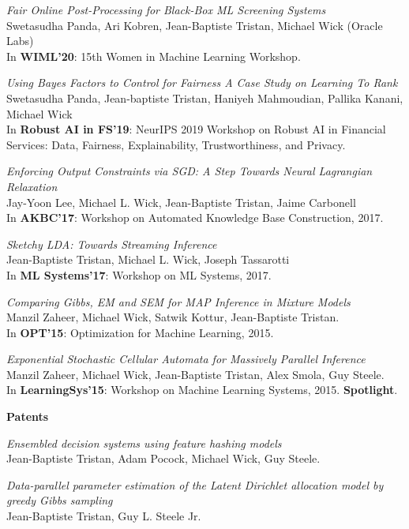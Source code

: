 \documentclass[margin,line]{res}
\begin{document}
\begin{resume}
\emph{Fair Online Post-Processing for Black-Box ML Screening Systems}\\
Swetasudha Panda, Ari Kobren, Jean-Baptiste Tristan, Michael Wick (Oracle Labs)\\
In {\bf WIML'20}: 15th Women in Machine Learning Workshop.

\emph{Using Bayes Factors to Control for Fairness A Case Study on Learning To Rank}\\
Swetasudha Panda, Jean-baptiste Tristan, Haniyeh Mahmoudian, Pallika Kanani, Michael Wick\\
In {\bf Robust AI in FS'19}: NeurIPS 2019 Workshop on Robust AI in Financial Services: Data, Fairness, Explainability, Trustworthiness, and Privacy.

\emph{Enforcing Output Constraints via SGD: A Step Towards Neural Lagrangian Relaxation}\\
Jay-Yoon Lee, Michael L. Wick, Jean-Baptiste Tristan, Jaime Carbonell\\
In {\bf AKBC'17}: Workshop on Automated Knowledge Base Construction, 2017.

\emph{Sketchy LDA: Towards Streaming Inference}\\
Jean-Baptiste Tristan, Michael L. Wick, Joseph Tassarotti\\
In {\bf ML Systems'17}: Workshop on ML Systems, 2017.


\emph{Comparing Gibbs, EM and SEM for MAP Inference in Mixture Models}\\
Manzil Zaheer, Michael Wick, Satwik Kottur, Jean-Baptiste Tristan.\\
In {\bf OPT'15}: Optimization for Machine Learning, 2015. 

\emph{Exponential Stochastic Cellular Automata for Massively Parallel Inference}\\
Manzil Zaheer, Michael Wick, Jean-Baptiste Tristan, Alex Smola, Guy Steele.\\
In {\bf LearningSys'15}: Workshop on Machine Learning Systems, 2015. {\bf Spotlight}. 

\newpage
  {\bf {\Large Patents}}

\emph{Ensembled decision systems using feature hashing models}\\
Jean-Baptiste Tristan, Adam Pocock, Michael Wick, Guy Steele.

\emph{Data-parallel parameter estimation of the Latent Dirichlet allocation model by greedy Gibbs sampling}\\
Jean-Baptiste Tristan, Guy L. Steele Jr.


\end{resume}
\end{document}
